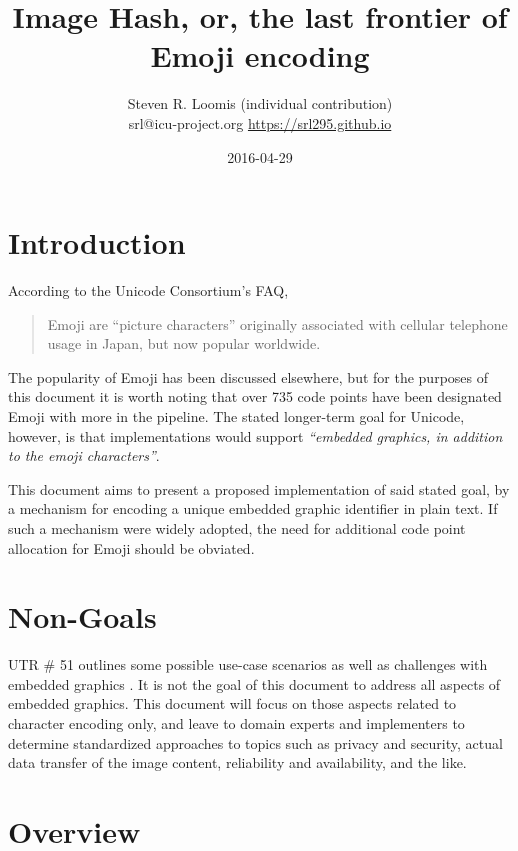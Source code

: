 \documentclass[12pt]{article}
\title{Image Hash, or, the last frontier of Emoji encoding}
\author{Steven R. Loomis (individual contribution) \\
		srl@icu-project.org \url{https://srl295.github.io}}
\date{2016-04-29}                                           %
\begin{document}
\maketitle

\section{Introduction}


According to the Unicode Consortium's FAQ, 

\begin{quote}
Emoji are ``picture characters'' originally associated with cellular telephone usage in Japan, but now popular worldwide.
\autocite{UnicodeFAQEmoji}
\end{quote}

The popularity of Emoji has been discussed elsewhere, but for the purposes of this document
it is worth noting that over 735 code points have been designated Emoji\autocite[Section 3, ``Which Characters are Emoji'']{UTR51} with more in the pipeline.
The stated longer-term goal for Unicode, however, is that implementations would support \textit{``embedded graphics, in addition to the emoji characters''}\autocite[Section 8, ``Longer Term Solutions'']{UTR51}.

This document aims to present a proposed implementation of said stated goal, by
a mechanism for encoding a unique embedded graphic identifier in plain text. If such a mechanism
were widely adopted,  the need for additional code point allocation for Emoji should be obviated.

\section{Non-Goals}

UTR \# 51 outlines some possible use-case scenarios as well as challenges with embedded graphics \autocite[Section 8, ``Longer Term Solutions'']{UTR51}. It is not the goal of this document to
address all aspects of embedded graphics. This document will focus on those aspects related to character
encoding only, and leave to domain experts and implementers to determine standardized
approaches to topics such as privacy and security, actual data transfer of the image content,
reliability and availability, and the like.


\section{Overview}
\end{document}
